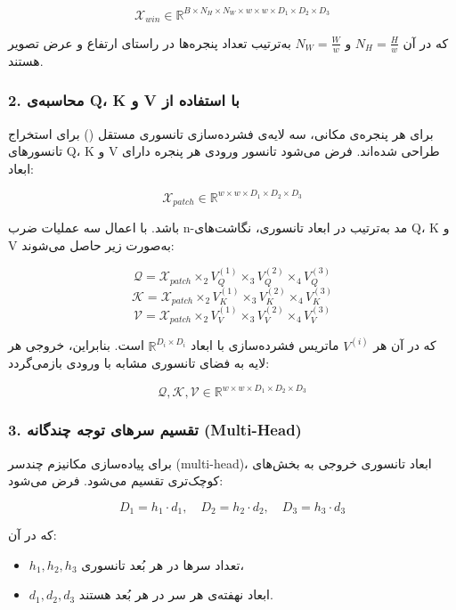 \[
\mathcal{X}_{win} \in \mathbb{R}^{B \times N_H \times N_W \times w \times w \times D_1 \times D_2 \times D_3}
\]

که در آن $N_H = \frac{H}{w}$ و $N_W = \frac{W}{w}$ به‌ترتیب تعداد پنجره‌ها در راستای ارتفاع و عرض تصویر هستند.

\subsubsection*{2. محاسبه‌ی Q، K و V با استفاده از }

برای هر پنجره‌ی مکانی، سه لایه‌ی فشرده‌سازی تانسوری مستقل () برای استخراج تانسورهای Q، K و V طراحی شده‌اند. فرض می‌شود تانسور ورودی هر پنجره دارای ابعاد:

\[
\mathcal{X}_{patch} \in \mathbb{R}^{w \times w \times D_1 \times D_2 \times D_3}
\]

باشد. با اعمال سه عملیات ضرب n-مد به‌ترتیب در ابعاد تانسوری، نگاشت‌های Q، K و V به‌صورت زیر حاصل می‌شوند:

\[
\mathcal{Q} = \mathcal{X}_{patch} \times_2 V_Q^{(1)} \times_3 V_Q^{(2)} \times_4 V_Q^{(3)}
\]
\[
\mathcal{K} = \mathcal{X}_{patch} \times_2 V_K^{(1)} \times_3 V_K^{(2)} \times_4 V_K^{(3)}
\]
\[
\mathcal{V} = \mathcal{X}_{patch} \times_2 V_V^{(1)} \times_3 V_V^{(2)} \times_4 V_V^{(3)}
\]

که در آن هر $V^{(i)}$ ماتریس فشرده‌سازی با ابعاد $\mathbb{R}^{D_i \times D_i}$ است. بنابراین، خروجی هر لایه به فضای تانسوری مشابه با ورودی بازمی‌گردد:

\[
\mathcal{Q}, \mathcal{K}, \mathcal{V} \in \mathbb{R}^{w \times w \times D_1 \times D_2 \times D_3}
\]

\subsubsection*{3. تقسیم سرهای توجه چندگانه (Multi-Head)}

برای پیاده‌سازی مکانیزم چندسر (multi-head)، ابعاد تانسوری خروجی به بخش‌های کوچک‌تری تقسیم می‌شود. فرض می‌شود:

\[
D_1 = h_1 \cdot d_1, \quad D_2 = h_2 \cdot d_2, \quad D_3 = h_3 \cdot d_3
\]

که در آن:
\begin{itemize}
	\item $h_1, h_2, h_3$ تعداد سرها در هر بُعد تانسوری،
	\item $d_1, d_2, d_3$ ابعاد نهفته‌ی هر سر در هر بُعد هستند.
\end{itemize}

